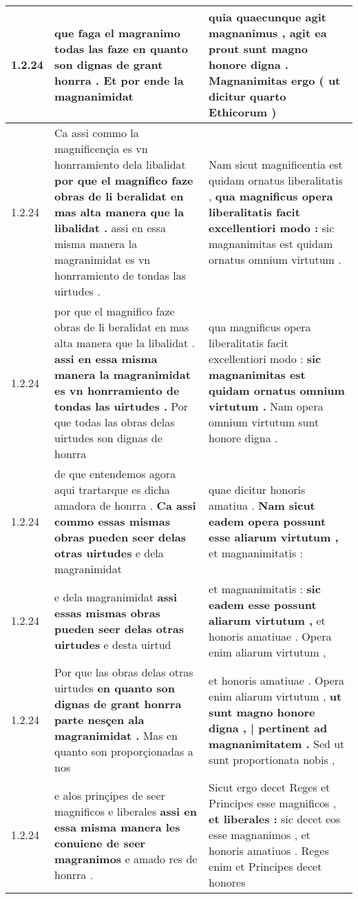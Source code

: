 \begin{tabular}{|p{1cm}|p{6.5cm}|p{6.5cm}|}
1.2.24 & que faga el magranimo todas las faze \textbf{ en quanto son dignas de grant honrra . } Et por ende la magnanimidat & quia quaecunque agit magnanimus , \textbf{ agit ea prout sunt magno honore digna . Magnanimitas ergo } ( ut dicitur quarto Ethicorum ) \\\hline
1.2.24 & Ca assi commo la magnificençia es vn honrramiento dela libalidat \textbf{ por que el magnifico faze obras de li beralidat en mas alta manera que la libalidat . } assi en essa misma manera la magranimidat es vn honrramiento de tondas las uirtudes . & Nam sicut magnificentia est quidam ornatus liberalitatis , \textbf{ qua magnificus opera liberalitatis facit excellentiori modo : } sic magnanimitas est quidam ornatus omnium virtutum . \\\hline
1.2.24 & por que el magnifico faze obras de li beralidat en mas alta manera que la libalidat . \textbf{ assi en essa misma manera la magranimidat es vn honrramiento de tondas las uirtudes . } Por que todas las obras delas uirtudes son dignas de honrra & qua magnificus opera liberalitatis facit excellentiori modo : \textbf{ sic magnanimitas est quidam ornatus omnium virtutum . } Nam opera omnium virtutum sunt honore digna . \\\hline
1.2.24 & de que entendemos agora aqui trartarque es dicha amadora de honrra . \textbf{ Ca assi commo essas mismas obras pueden seer delas otras uirtudes } e dela magranimidat & quae dicitur honoris amatiua . \textbf{ Nam sicut eadem opera possunt esse aliarum virtutum , } et magnanimitatis : \\\hline
1.2.24 & e dela magranimidat \textbf{ assi essas mismas obras pueden seer delas otras uirtudes } e desta uirtud & et magnanimitatis : \textbf{ sic eadem esse possunt aliarum virtutum , } et honoris amatiuae . Opera enim aliarum virtutum , \\\hline
1.2.24 & Por que las obras delas otras uirtudes \textbf{ en quanto son dignas de grant honrra parte nesçen ala magranimidat . } Mas en quanto son proporçionadas a nos & et honoris amatiuae . Opera enim aliarum virtutum , \textbf{ ut sunt magno honore digna , | pertinent ad magnanimitatem . } Sed ut sunt proportionata nobis , \\\hline
1.2.24 & e alos prinçipes de seer magnificos e liberales \textbf{ assi en essa misma manera les conuiene de seer magranimos } e amado res de honrra . & Sicut ergo decet Reges et Principes esse magnificos , \textbf{ et liberales : } sic decet eos esse magnanimos , et honoris amatiuos . Reges enim et Principes decet honores \\\hline

\end{tabular}
